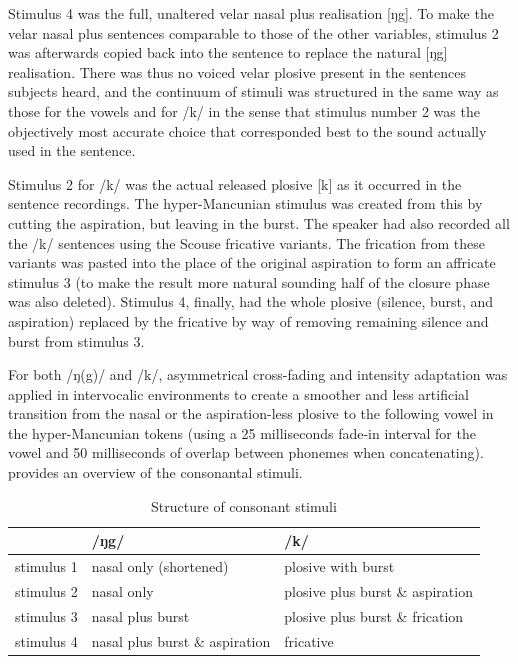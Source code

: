 Stimulus 4 was the full, unaltered velar nasal plus realisation [ŋg].
To make the velar nasal plus sentences comparable to those of the other variables, stimulus 2 was afterwards copied back into the sentence to replace the natural [ŋg] realisation.
There was thus no voiced velar plosive present in the sentences subjects heard, and the continuum of stimuli was structured in the same way as those for the vowels and for /k/ in the sense that stimulus number 2 was the objectively most accurate choice that corresponded best to the sound actually used in the sentence.

Stimulus 2 for /k/ was the actual released plosive [k] as it occurred in the sentence recordings.
The hyper-Mancunian stimulus was created from this by cutting the aspiration, but leaving in the burst.
The speaker had also recorded all the /k/ sentences using the Scouse fricative variants.
The frication from these variants was pasted into the place of the original aspiration to form an affricate stimulus 3 (to make the result more natural sounding half of the closure phase was also deleted).
Stimulus 4, finally, had the whole plosive (silence, burst, and aspiration) replaced by the fricative by way of removing remaining silence and burst from stimulus 3.

For both /ŋ(g)/ and /k/, asymmetrical cross-fading and intensity adaptation was applied in intervocalic environments to create a smoother and less artificial transition from the nasal or the aspiration-less plosive to the following vowel in the hyper-Mancunian tokens (using a 25 milliseconds fade-in interval for the vowel and 50 milliseconds of overlap between phonemes when concatenating).
 provides an overview of the consonantal stimuli.

\begin{table}
	\caption{Structure of consonant stimuli}
	\label{tab.consonant.stimuli}
	
	\begin{tabular}{lll}
		\toprule
		& /ŋg/ & /k/\\
		\midrule
		stimulus 1 & nasal only (shortened) & plosive with burst\\
		stimulus 2 & nasal only & plosive plus burst \& aspiration\\
		stimulus 3 & nasal plus burst & plosive plus burst \& frication\\
		stimulus 4 & nasal plus burst \& aspiration & fricative\\
		\bottomrule
	\end{tabular}
\end{table}

